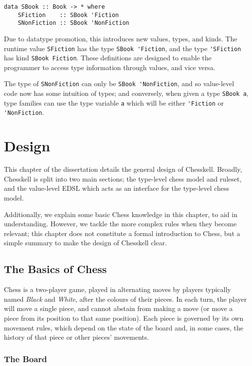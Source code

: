\documentclass[12pt, a4paper, bibliography=totocnumbered]{scrreprt}
\newcommand{\inline}[1]{\lstinline[basicstyle=\ttfamily\footnotesize]{#1}}
\begin{document}
\begin{lstlisting}
data SBook :: Book -> * where
    SFiction    :: SBook 'Fiction
    SNonFiction :: SBook 'NonFiction
\end{lstlisting}

Due to datatype promotion, this introduces new values, types, and kinds. The runtime value \inline{SFiction} has the type \inline{SBook 'Fiction}, and the type \inline{'SFiction} has kind \inline{SBook Fiction}. These definitions are designed to enable the programmer to access type information through values, and vice versa.

The type of \inline{SNonFiction} can only be \inline{SBook 'NonFiction}, and so value-level code now has some intuition of types; and conversely, when given a type \inline{SBook a}, type families can use the type variable \inline{a} which will be either \inline{'Fiction} or \inline{'NonFiction}.


\chapter{Design}

This chapter of the dissertation details the general design of Chesskell. Broadly, Chesskell is split into two main sections; the type-level chess model and ruleset, and the value-level EDSL which acts as an interface for the type-level chess model.

Additionally, we explain some basic Chess knowledge in this chapter, to aid in understanding. However, we tackle the more complex rules when they become relevant; this chapter does not constitute a formal introduction to Chess, but a simple summary to make the design of Chesskell clear.

\section{The Basics of Chess}

Chess is a two-player game, played in alternating moves by players typically named \emph{Black} and \emph{White}, after the colours of their pieces. In each turn, the player will move a single piece, and cannot abstain from making a move (or move a piece from its position to that same position). Each piece is governed by its own movement rules, which depend on the state of the board and, in some cases, the history of that piece or other pieces' movements.

\subsection{The Board}
\end{document}
